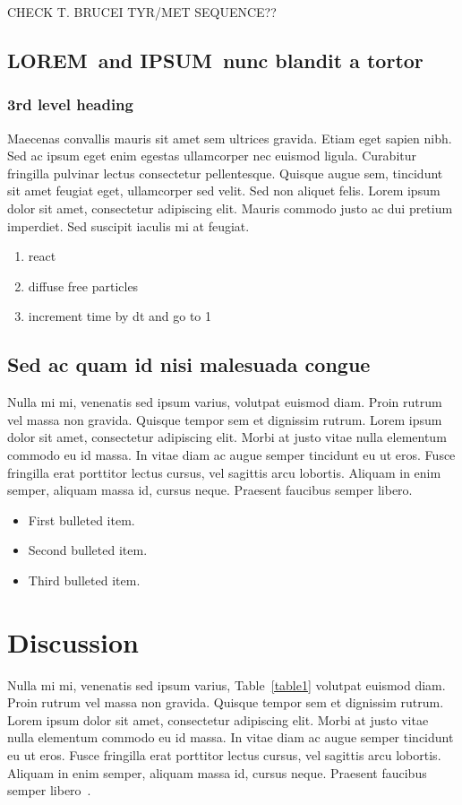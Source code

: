 \documentclass[10pt,letterpaper]{article}
\newcommand{\lorem}{{\bf LOREM}}
\newcommand{\ipsum}{{\bf IPSUM}}
\begin{document}
CHECK T. BRUCEI TYR/MET SEQUENCE??

\subsection*{\lorem\ and \ipsum\ nunc blandit a tortor}
\subsubsection*{3rd level heading} 
Maecenas convallis mauris sit amet sem ultrices gravida. Etiam eget sapien nibh. Sed ac ipsum eget enim egestas ullamcorper nec euismod ligula. Curabitur fringilla pulvinar lectus consectetur pellentesque. Quisque augue sem, tincidunt sit amet feugiat eget, ullamcorper sed velit. Sed non aliquet felis. Lorem ipsum dolor sit amet, consectetur adipiscing elit. Mauris commodo justo ac dui pretium imperdiet. Sed suscipit iaculis mi at feugiat. 

\begin{enumerate}
	\item{react}
	\item{diffuse free particles}
	\item{increment time by dt and go to 1}
\end{enumerate}


\subsection*{Sed ac quam id nisi malesuada congue}

Nulla mi mi, venenatis sed ipsum varius, volutpat euismod diam. Proin rutrum vel massa non gravida. Quisque tempor sem et dignissim rutrum. Lorem ipsum dolor sit amet, consectetur adipiscing elit. Morbi at justo vitae nulla elementum commodo eu id massa. In vitae diam ac augue semper tincidunt eu ut eros. Fusce fringilla erat porttitor lectus cursus, vel sagittis arcu lobortis. Aliquam in enim semper, aliquam massa id, cursus neque. Praesent faucibus semper libero.

\begin{itemize}
	\item First bulleted item.
	\item Second bulleted item.
	\item Third bulleted item.
\end{itemize}

\section*{Discussion}
Nulla mi mi, venenatis sed ipsum varius, Table~\ref{table1} volutpat euismod diam. Proin rutrum vel massa non gravida. Quisque tempor sem et dignissim rutrum. Lorem ipsum dolor sit amet, consectetur adipiscing elit. Morbi at justo vitae nulla elementum commodo eu id massa. In vitae diam ac augue semper tincidunt eu ut eros. Fusce fringilla erat porttitor lectus cursus, vel sagittis arcu lobortis. Aliquam in enim semper, aliquam massa id, cursus neque. Praesent faucibus semper libero~\cite{bib3}.
\end{document}
